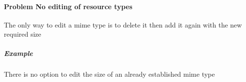 \paragraph{Problem No editing of resource types}
	The only way to edit a mime type is to delete it then add it again with the new required size
	\subparagraph{Example}
		There is no option to edit the size of an already established mime type
